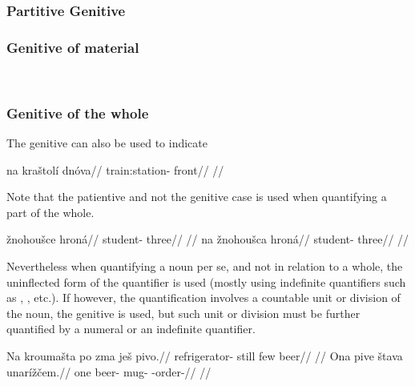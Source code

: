 \pex
\a  {}\\
\a  {}\\
\xe

\subsubsection{Partitive Genitive}

\subsubsection{Genitive of material}

\ex
{}\\
\irdp{}{}
\xe

\subsubsection{Genitive of the whole}
The genitive can also be used to indicate

\pex
\begingl
\gla na kraštolí dnóva//
\glb \Loc{} train:station-\Gen{} front//
\glft {}//
\endgl
\xe

Note that the patientive and not the genitive case is used when quantifying a part of the whole.

\pex
\a
\begingl
\gla *žnohoušce hroná//
\glb student-\Gen{} three//
\glft {}//
\endgl
\a
\begingl
\gla na žnohoušca hroná//
\glb \Loc{} student-\Gen{} three//
\glft {}//
\endgl
\xe

Nevertheless when quantifying a noun per se, and not in relation to a whole, the uninflected form of the quantifier is used (mostly using indefinite quantifiers such as , , etc.). If however, the quantification involves a countable unit or division of the noun, the genitive is used, but such unit or division must be further quantified by a numeral or an indefinite quantifier.

\pex
\a
\begingl
\gla Na kroumašta po zma ješ pivo.//
\glb \Loc{} refrigerator-\Acc{} still few \Exst{} beer//
\glft {}//
\endgl
\a
\begingl
\gla Ona pive štava unarížčem.//
\glb one beer-\Gen{} mug-\Acc{} \Refl{}-order-//
\glft {}//
\endgl
\xe

